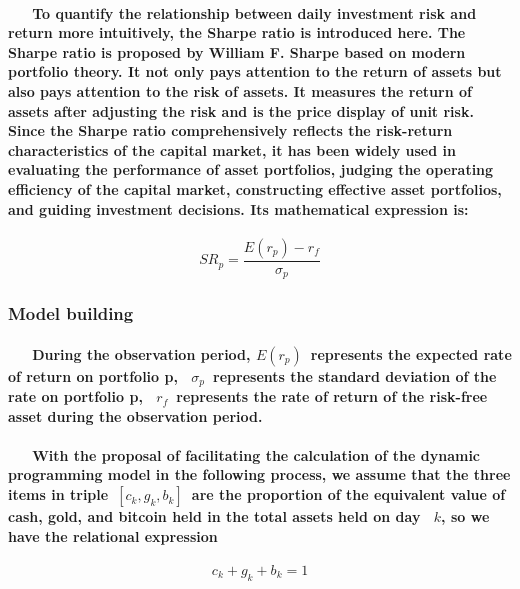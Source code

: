 \documentclass{mcmthesis}
\begin{document}
	\paragraph{
	\ \ \ To quantify the relationship between daily investment risk and return more intuitively,\cite{LHJY} the Sharpe ratio is introduced here. The Sharpe ratio is proposed by William F. Sharpe based on modern portfolio theory. It not only pays attention to the return of assets but also pays attention to the risk of assets. It measures the return of assets after adjusting the risk and is the price display of unit risk. Since the Sharpe ratio comprehensively reflects the risk-return characteristics of the capital market, it has been widely used in evaluating the performance of asset portfolios, judging the operating efficiency of the capital market, constructing effective asset portfolios, and guiding investment decisions. Its mathematical expression is:
	}
	
	\begin{equation}
		SR_{p} = \frac{E(r_{p})-r_{f}}{\sigma_{p}}
	\end{equation}

	\subsubsection{Model building}
	
	\paragraph{
		\ \ \ During the observation period,
		$E(r_{p})$\ represents the expected rate of return on portfolio p, \ $\sigma_{p}$\ represents the standard deviation of the rate on portfolio p, \ $r_{f}$\ represents the rate of return of the risk-free asset during the observation period.
	}
	
	\paragraph{
		\ \ \ With the proposal of facilitating the calculation of the dynamic programming model in the following process, we assume that the three items in triple\ $ [c_{k}, g_{k}, b_{k}] $\ are the proportion of the equivalent value of cash, gold, and bitcoin held in the total assets held on day \ $k$, so we have the relational expression
	}
	
	\begin{equation}
		c_{k}+g_{k}+b_{k}=1
	\end{equation}
	
\end{document}
